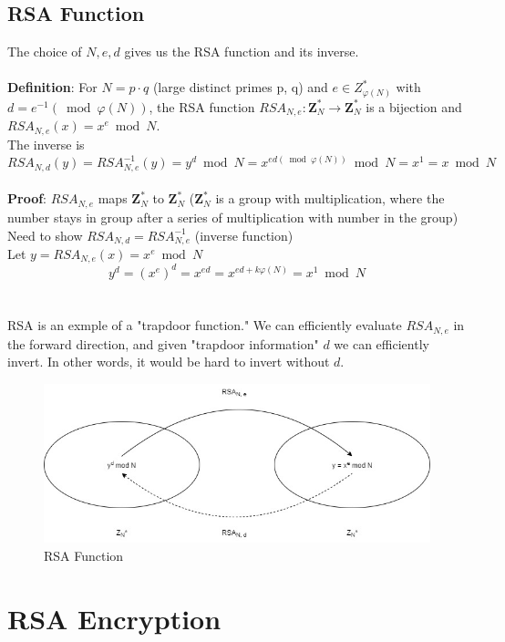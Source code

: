 \documentclass{scribe}
\begin{document}
\subsection{RSA Function}
The choice of $N, e, d$ gives us the RSA function and its inverse.
\\\\
\textbf{Definition}: For $N=p \cdot q$ (large distinct primes p, q) and $e \in Z_{\varphi(N)}^*$ with $d = e^{-1} (\bmod \varphi(N))$, the RSA function $RSA _{N,e}: \mathbf{Z}_N^* \rightarrow \mathbf{Z}_N^*$ is a bijection and $RSA _{N,e}(x) = x^e \bmod N $.
\\
The inverse is $RSA _{N,d}(y) = RSA _{N,e}^{-1}(y) = y^d \bmod N  = x ^{ed (\bmod \varphi(N))} \bmod N = x ^1 = x \bmod N$
\\\\
\textbf{Proof}: $RSA_{N,e}$ maps $\mathbf{Z}_N^*$ to $\mathbf{Z}_N^*$ ($\mathbf{Z}_N^*$ is a group with multiplication, where the number stays in group after a series of multiplication with number in the group)
\\
Need to show $RSA _{N,d}= RSA _{N,e}^{-1}$ (inverse function)
\\
Let  $ y  = RSA _{N,e}(x) = x ^e \bmod N$
\[ y ^d = (x^e)^d = x^{ed}  = x^{ed + k \varphi(N)} = x^1 \bmod N\]
\\\\
RSA is an exmple of a "trapdoor function." We can efficiently evaluate $RSA_{N,e}$ in the forward direction, and given "trapdoor information" $d$ we can efficiently invert. In other words, it would be hard to invert without $d$.
\begin{figure}[H]
    \centering
    \includegraphics[scale=0.5]{rsa_function.jpg}
    \caption{RSA Function}
\end{figure}
\vspace{10mm}
\section{RSA Encryption}
\end{document}
